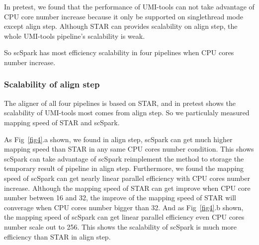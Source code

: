 \documentclass[conference]{IEEEtran}
\begin{document}
In pretest, we found that the performance of UMI-tools can not take advantage of CPU core number increase because it only be supported on single\-thread mode except align step.
Although STAR can provides scalability on align step, the whole UMI-tools pipeline's scalability is weak.

So scSpark has most efficiency scalability in four pipelines when CPU cores number increase.

\subsubsection{Scalability of align step}
The aligner of all four pipelines is based on STAR, and in pretest shows the scalability of UMI-tools most comes from align step.
So we particulaly measured mapping speed of STAR and scSpark.

As Fig~\ref{fig4}.a shown, we found in align step, scSpark can get much higher mapping speed than STAR in any same CPU cores number condition.
This shows scSpark can take advantage of scSpark reimplement the method to storage the temporary result of pipeline in align step.
Furthermore, we found the mapping speed of scSpark can get nearly linear parallel efficiency with CPU cores number increase.
Although the mapping speed of STAR can get improve when CPU core number between 16 and 32, the improve of the mapping speed of STAR will converage when CPU cores number bigger than 32.
And as Fig~\ref{fig4}.b shown, the mapping speed of scSpark can get linear parallel efficiency even CPU cores number scale out to 256.
This shows the scalability of scSpark is much more efficiency than STAR in align step.
\end{document}
